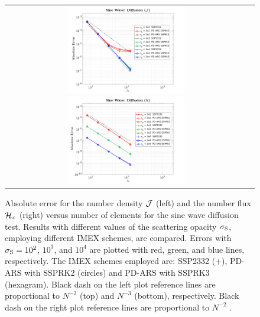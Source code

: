 \begin{figure}[h]
  \centering
  \begin{tabular}{cc}
    \includegraphics[width=0.5\textwidth]{figures/SineWaveDiffusionJ}
    \includegraphics[width=0.5\textwidth]{figures/SineWaveDiffusionH}
  \end{tabular}
   \caption{Absolute error for the number density $\mathcal{J}$ (left) and the number flux $\mathcal{H}_{x}$ (right) versus number of elements for the sine wave diffusion test.  Results with different values of the scattering opacity $\sigma_{{\rm S}}$, employing different IMEX schemes, are compared.  Errors with $\sigma_{{\rm S}}=10^{2}$, $10^{3}$, and $10^{4}$ are plotted with red, green, and blue lines, respectively.  The IMEX schemes employed are:  SSP2332 ($+$), PD-ARS with SSPRK2 (circles) and PD-ARS with SSPRK3 (hexagram). Black dash on the left plot reference lines are proportional to $N^{-2}$ (top) and $N^{-3}$ (bottom), respectively. Black dash on the right plot reference lines are proportional to $N^{-2}$ .}
   \label{fig:SineWaveDiffusionJ}
\end{figure}

